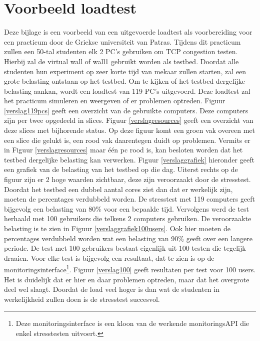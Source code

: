 \chapter{Voorbeeld loadtest}
\npar
Deze bijlage is een voorbeeld van een uitgevoerde loadtest als voorbereiding voor een practicum door de Griekse universiteit van Patras. Tijdens dit practicum zullen een 50-tal studenten elk 2 PC's gebruiken om TCP congestion testen. Hierbij zal de virtual wall of wall1 gebruikt worden als testbed. Doordat alle studenten hun experiment op zeer korte tijd van mekaar zullen starten, zal een grote belasting ontstaan op het testbed. Om te kijken of het testbed dergelijke belasting aankan, wordt een loadtest van 119 PC's uitgevoerd. Deze loadtest zal het practicum simuleren en weergeven of er problemen optreden. 
\npar
Figuur \ref{verslag119pcs} geeft een overzicht van de gebruikte computers. Deze computers zijn per twee opgedeeld in slices. Figuur \ref{verslagresources} geeft een overzicht van deze slices met bijhorende status. Op deze figuur komt een groen vak overeen met een slice die gelukt is, een rood vak daarentegen duidt op problemen.
\npar
Vermits er in Figuur \ref{verslagresources} maar \'e\'en pc rood is, kan besloten worden dat het testbed dergelijke belasting kan verwerken. Figuur \ref{verslaggrafiek} hieronder geeft een grafiek van de belasting van het testbed op die dag. Uiterst rechts op de figuur zijn er 2 hoge waarden zichtbaar, deze zijn veroorzaakt door de stresstest. Doordat het testbed een dubbel aantal cores ziet dan dat er werkelijk zijn, moeten de percentages verdubbeld worden. De stresstest met 119 computers geeft bijgevolg een belasting van 80\% voor een bepaalde tijd.
\clearpage
\npar
Vervolgens werd de test herhaald met 100 gebruikers die telkens 2 computers gebruiken. De veroorzaakte belasting is te zien in Figuur \ref{verslaggrafiek100users}. Ook hier moeten de percentages verdubbeld worden wat een belasting van 90\% geeft over een langere periode.
\npar
De test met 100 gebruikers bestaat eigenlijk uit 100 testen die tegelijk draaien. Voor elke test is bijgevolg een resultaat, dat te zien is op de monitoringsinterface\footnote{Deze monitoringsinterface is een kloon van de werkende monitoringsAPI die enkel stresstesten uitvoert.}. Figuur \ref{verslag100} geeft resultaten per test voor 100 users. Het is duidelijk dat er hier en daar problemen optreden, maar dat het overgrote deel wel slaagt.
\npar
Doordat de load veel hoger is dan wat de studenten in werkelijkheid zullen doen is de stresstest succesvol. 
